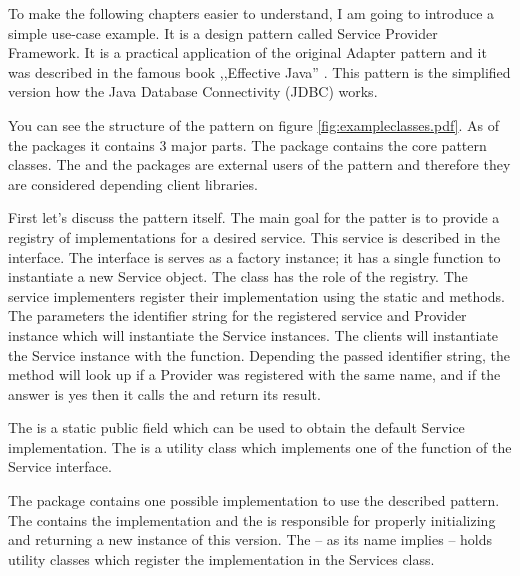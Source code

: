 To make the following chapters easier to understand, I am going to introduce a
simple use-case example. It is a design pattern called Service Provider
Framework. It is a practical application of the original Adapter pattern and it
was described in the famous book ,,Effective Java'' \cite{Bloch08}. This pattern
is the simplified version how the Java Database Connectivity (JDBC) works.


You can see the structure of the pattern on figure
\autoref{fig:exampleclasses.pdf}. As of the packages it contains 3 major parts.
The  package contains the core pattern classes. The 
and the  packages are external users of the pattern and therefore
they are considered depending client libraries.

First let's discuss the pattern itself. The main goal for the patter is to
provide a registry of implementations for a desired service. This service is
described in the  interface. The  interface is
serves as a factory instance; it has a single function to instantiate a new
Service object. The  class has the role of the registry.
The service implementers register their implementation using the static
 and  methods. The
parameters the identifier string for the registered service and Provider
instance which will instantiate the Service instances. The clients will
instantiate the Service instance with the  function.
Depending the passed identifier string, the method will look up if a Provider
was registered with the same name, and if the answer is yes then it calls the
 and return its result.

The  is a static public field which can be used to
obtain the default Service implementation. The  is a
utility class which implements one of the function of the Service interface.

The  package contains one possible implementation to use the
described pattern. The  contains the implementation and the
 is responsible for properly initializing and returning a
new instance of this version. The  -- as its name implies --
holds utility classes which register the implementation in the Services class.

